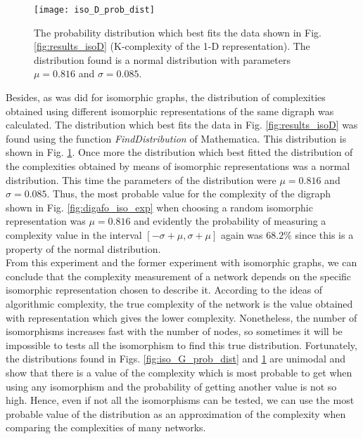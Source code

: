 \begin{figure}
\centering
\texttt{[image: iso\_D\_prob\_dist]}
\caption[The distribution of complexities for the isomorphic representations of a digraph.]{The probability distribution which best fits the data shown in Fig. \ref{fig:results_isoD} (K-complexity of the 1-D representation). The distribution found is a normal distribution with parameters $\mu =0.816$ and $\sigma =0.085$.}
\label{fig:iso_D_prob_dist}
\end{figure}

Besides, as was did for isomorphic graphs, the distribution of complexities obtained using different isomorphic representations of the same digraph was calculated. The distribution which best fits the data in Fig. \ref{fig:results_isoD} was found using the function \textit{FindDistribution} of Mathematica. This distribution is shown in Fig. \ref{fig:iso_D_prob_dist}. Once more the distribution which best fitted the distribution of the complexities obtained by means of isomorphic representations was a normal distribution. This time the parameters of the distribution were $\mu =0.816$ and $\sigma =0.085$. Thus, the most probable value for the complexity of the digraph shown in Fig. \ref{fig:digafo_iso_exp} when choosing a random isomorphic representation was $\mu =0.816$ and evidently the probability of measuring a complexity value in the interval $[- \sigma + \mu , \sigma + \mu]$ again was $68.2 \%$ since this is a property of the normal distribution.\\

From this experiment and the former experiment with isomorphic graphs, we can conclude that the complexity measurement of a network depends on the specific isomorphic representation chosen to describe it. According to the ideas of algorithmic complexity, the true complexity of the network is the value obtained with representation which gives the lower complexity. Nonetheless, the number of isomorphisms increases fast with the number of nodes, so sometimes it will be impossible to tests all the isomorphism to find this true distribution. Fortunately, the distributions found in Figs. \ref{fig:iso_G_prob_dist} and \ref{fig:iso_D_prob_dist} are unimodal and show that there is a value of the complexity which is most probable to get when using any isomorphism and the probability of getting another value is not so high. Hence, even if not all the isomorphisms can be tested, we can use the most probable value of the distribution as an approximation of the complexity when comparing the complexities of many networks.

